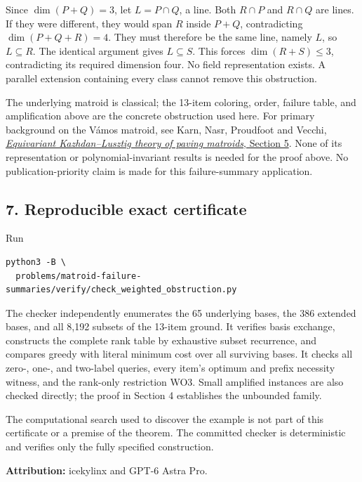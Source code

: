 Since \(\dim(P+Q)=3\), let \(L=P\cap Q\), a line. Both \(R\cap P\) and \(R\cap Q\) are lines. If they were different, they would span \(R\) inside \(P+Q\), contradicting \(\dim(P+Q+R)=4\). They must therefore be the same line, namely \(L\), so \(L\subseteq R\). The identical argument gives \(L\subseteq S\). This forces \(\dim(R+S)\le3\), contradicting its required dimension four. No field representation exists. A parallel extension containing every class cannot remove this obstruction.

The underlying matroid is classical; the 13-item coloring, order, failure table, and amplification above are the concrete obstruction used here. For primary background on the Vámos matroid, see Karn, Nasr, Proudfoot and Vecchi, \href{https://pages.uoregon.edu/njp/eq-relax.pdf}{\emph{Equivariant Kazhdan--Lusztig theory of paving matroids}, Section 5}. None of its representation or polynomial-invariant results is needed for the proof above. No publication-priority claim is made for this failure-summary application.

\hypertarget{af-f44144c751-reproducible-exact-certificate}{%
\subsection{7. Reproducible exact certificate}\label{af-f44144c751-reproducible-exact-certificate}}

Run

\begin{verbatim}
python3 -B \
  problems/matroid-failure-summaries/verify/check_weighted_obstruction.py
\end{verbatim}

The checker independently enumerates the 65 underlying bases, the 386 extended bases, and all 8,192 subsets of the 13-item ground. It verifies basis exchange, constructs the complete rank table by exhaustive subset recurrence, and compares greedy with literal minimum cost over all surviving bases. It checks all zero-, one-, and two-label queries, every item's optimum and prefix necessity witness, and the rank-only restriction WO3. Small amplified instances are also checked directly; the proof in Section 4 establishes the unbounded family.

The computational search used to discover the example is not part of this certificate or a premise of the theorem. The committed checker is deterministic and verifies only the fully specified construction.

\textbf{Attribution:} icekylinx and GPT-6 Astra Pro.
